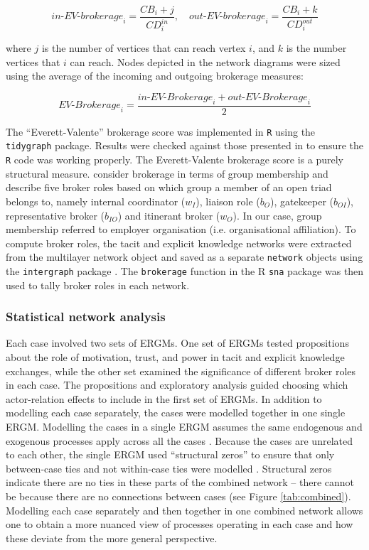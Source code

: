 $$\textit{in-EV-brokerage}_i = \frac{CB_i + j}{CD_i^{in}},  \,\,\,\,\,\, \textit{out-EV-brokerage}_i = \frac{CB_i + k}{CD_i^{out}} $$ \medskip

\noindent where $j$ is the number of vertices that can reach vertex $i$, and $k$ is the number vertices that $i$ can reach. Nodes depicted in the network diagrams were sized using the average of the incoming and outgoing brokerage measures: \medskip

$$ \textit{EV-Brokerage}_i = \frac{\textit{in-EV-Brokerage}_i + \textit{out-EV-Brokerage}_i}{2} $$ \medskip

The \enquote{Everett-Valente} brokerage score was implemented in \texttt{R} using the \texttt{tidygraph} package. Results were checked against those presented in \citet{everett2016bridging} to ensure the \texttt{R} code was working properly. The Everett-Valente brokerage score is a purely structural measure. \citet{gould1989structures} consider brokerage in terms of group membership and describe five broker roles based on which group a member of an open triad belongs to, namely internal coordinator ($w_I$), liaison role ($b_O$), gatekeeper ($b_{OI}$), representative broker ($b_{IO}$) and itinerant broker ($w_O$). In our case, group membership referred to employer organisation (i.e. organisational affiliation). To compute \citet{gould1989structures} broker roles, the tacit and explicit knowledge networks were extracted from the multilayer network object and saved as a separate \texttt{network} objects \citep{butts2008network} using the \texttt{intergraph} package \citep{bojanowski2015intergraph}. The \texttt{brokerage} function in the R \texttt{sna} package \citep{butts2016sna} was then used to tally broker roles in each network. 

\subsubsection{Statistical network analysis} \label{sec:stat_networks}

Each case involved two sets of ERGMs. One set of ERGMs tested propositions about the role of motivation, trust, and power in tacit and explicit knowledge exchanges, while the other set examined the significance of different broker roles in each case. The propositions and exploratory analysis guided choosing which actor-relation effects to include in the first set of ERGMs. In addition to modelling each case separately, the cases were modelled together in one single ERGM. Modelling the cases in a single ERGM assumes the same endogenous and exogenous processes apply across all the cases \citep{kalish2013brain}. Because the cases are unrelated to each other, the single ERGM used \enquote{structural zeros} to ensure that only between-case ties and not within-case ties were modelled \citep{lusher2012trust}. Structural zeros indicate there are no ties in these parts of the combined network -- there cannot be because there are no connections between cases (see Figure \ref{tab:combined}). Modelling each case separately and then together in one combined network allows one to obtain a more nuanced view of processes operating in each case and how these deviate from the more general perspective. \medskip

